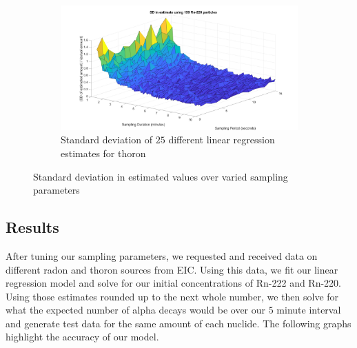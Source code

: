 \documentclass[11pt]{m2pi}
\begin{document}
\begin{figure}[h]\ContinuedFloat
\centering
        \begin{subfigure}[c]{\textwidth}  
            \includegraphics[scale=0.14]{images/std_rn220_gridsearch.jpg}
            \caption[]%
            {{\tiny Standard deviation of $25$ different linear regression estimates for thoron}}    
            \label{fig:ThoronGridsearch}
        \end{subfigure}
        \caption[ The average and standard deviation of critical parameters ]
        {\tiny Standard deviation in estimated values over varied sampling parameters} 
        \label{fig:Gridsearch}
\end{figure}


\subsection{Results}\label{SS:Results}

After tuning our sampling parameters, we requested and received data on different radon and thoron sources from EIC. Using this data, we fit our linear regression model and solve for our initial concentrations of Rn-222 and Rn-220. Using those estimates rounded up to the next whole number, we then solve for what the expected number of alpha decays would be over our $5$ minute interval and generate test data for the same amount of each nuclide. The following graphs highlight the accuracy of our model.\\
\end{document}
